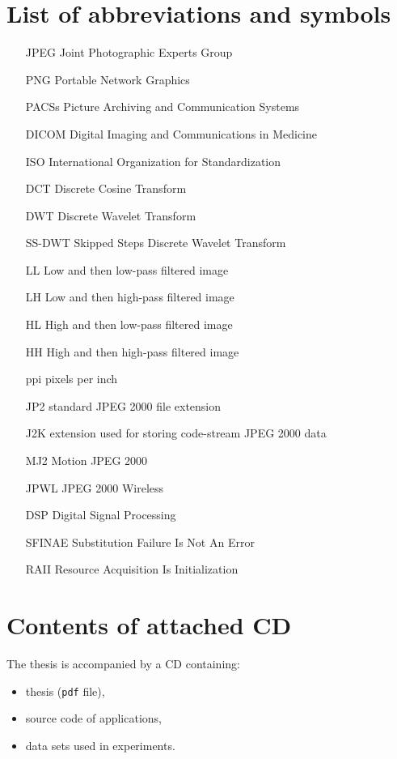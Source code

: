 \chapter*{List of abbreviations and symbols}

\begin{itemize}
\item[JPEG] Joint Photographic Experts Group
\item[PNG] Portable Network Graphics
\item[PACSs] Picture Archiving and Communication Systems
\item[DICOM] Digital Imaging and Communications in Medicine
\item[ISO] International Organization for Standardization
\item[DCT] Discrete Cosine Transform
\item[DWT] Discrete Wavelet Transform
\item[SS-DWT] Skipped Steps Discrete Wavelet Transform
\item[LL] Low and then low-pass filtered image
\item[LH] Low and then high-pass filtered image
\item[HL] High and then low-pass filtered image
\item[HH] High and then high-pass filtered image
\item[ppi] pixels per inch
\item[JP2] standard JPEG 2000 file extension
\item[J2K] extension used for storing code-stream JPEG 2000 data
\item[MJ2] Motion JPEG 2000
\item[JPWL] JPEG 2000 Wireless
\item[DSP] Digital Signal Processing
\item[SFINAE] Substitution Failure Is Not An Error
\item[RAII] Resource Acquisition Is Initialization
\end{itemize}

\chapter*{Contents of attached CD}

The thesis is accompanied by a CD containing:
\begin{itemize}
\item thesis (\texttt{pdf} file),
\item source code of applications,
\item data sets used in experiments.
\end{itemize}
